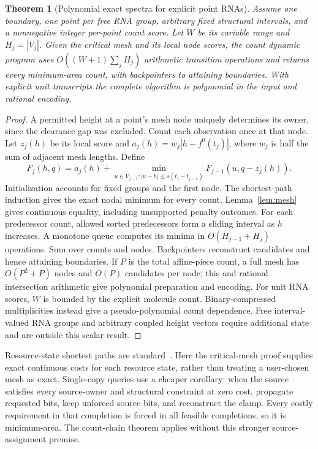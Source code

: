 \documentclass[10pt,letterpaper]{article}
\newtheorem{theorem}{Theorem}
\begin{document}
\begin{samepage}
\begin{theorem}[Polynomial exact spectra for explicit point RNAs]\label{thm:chain}
Assume one boundary, one point per free RNA group, arbitrary fixed structural intervals, and a nonnegative integer per-point count score. Let $W$ be its variable range and $H_j=|V_j|$. Given the critical mesh and its local node scores, the count dynamic program uses $O((W+1)\sum_jH_j)$ arithmetic transition operations and returns every minimum-area count, with backpointers to attaining boundaries. With explicit unit transcripts the complete algorithm is polynomial in the input and rational encoding.
\end{theorem}
\end{samepage}
\begin{proof}
A permitted height at a point's mesh node uniquely determines its owner, since the clearance gap was excluded. Count each observation once at that node. Let $z_j(h)$ be its local score and $a_j(h)=w_j|h-f^0(t_j)|$, where $w_j$ is half the sum of adjacent mesh lengths. Define
\begin{equation}
F_j(h,q)=a_j(h)+\min_{u\in V_{j-1}:|u-h|\le s(t_j-t_{j-1})}
F_{j-1}(u,q-z_j(h)).\label{eq:dp}
\end{equation}
Initialization accounts for fixed groups and the first node. The shortest-path induction gives the exact nodal minimum for every count. Lemma~\ref{lem:mesh} gives continuous equality, including unsupported penalty outcomes. For each predecessor count, allowed sorted predecessors form a sliding interval as $h$ increases. A monotone queue computes its minima in $O(H_{j-1}+H_j)$ operations. Sum over counts and nodes. Backpointers reconstruct candidates and hence attaining boundaries.
If $P$ is the total affine-piece count, a full mesh has $O(P^2+P)$ nodes and $O(P)$ candidates per node; this and rational intersection arithmetic give polynomial preparation and encoding. For unit RNA scores, $W$ is bounded by the explicit molecule count. Binary-compressed multiplicities instead give a pseudo-polynomial count dependence. Free interval-valued RNA groups and arbitrary coupled height vectors require additional state and are outside this scalar result.
\end{proof}

Resource-state shortest paths are standard~\cite{hassin}. Here the critical-mesh proof supplies exact continuous costs for each resource state, rather than treating a user-chosen mesh as exact. Single-copy queries use a cheaper corollary: when the source satisfies every source-owner and structural constraint at zero cost, propagate requested bits, keep unforced source bits, and reconstruct the clamp. Every costly requirement in that completion is forced in all feasible completions, so it is minimum-area. The count-chain theorem applies without this stronger source-assignment premise.
\end{document}
